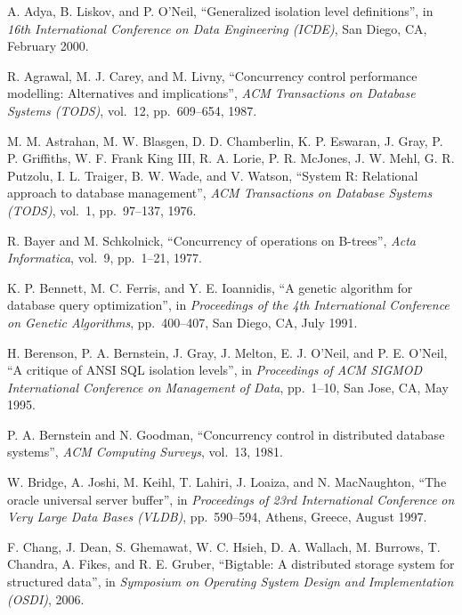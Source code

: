 \documentclass[b5paper,11pt,twoside,openright]{book}
\begin{document}
\begin{enumerate}[label={[\arabic*]}]

\item
  A. Adya, B. Liskov, and P. O'Neil, ``Generalized isolation level
  definitions'', in \emph{16th International Conference on Data Engineering (ICDE)}, San
Diego, CA, February 2000.
\item
  R. Agrawal, M. J. Carey, and M. Livny, ``Concurrency control
  performance modelling: Alternatives and implications'', \emph{ACM
  Transactions on Database Systems (TODS)}, vol.~12, pp.~609--654,
  1987.
\item
  M. M. Astrahan, M. W. Blasgen, D. D. Chamberlin, K. P. Eswaran, J.
  Gray, P. P. Griffiths, W. F. Frank King III, R. A. Lorie, P. R.
  McJones, J. W. Mehl, G. R. Putzolu, I. L. Traiger, B. W. Wade, and V.
  Watson, ``System R: Relational approach to database management'',
  \emph{ACM Transactions on Database Systems} \emph{(TODS)}, vol.~1,
  pp.~97--137, 1976.
\item
  R. Bayer and M. Schkolnick, ``Concurrency of operations on B-trees'',
  \emph{Acta} \emph{Informatica}, vol.~9, pp.~1--21, 1977.
\item
  K. P. Bennett, M. C. Ferris, and Y. E. Ioannidis, ``A genetic
  algorithm for database query optimization'', in \emph{Proceedings of
  the 4th International Conference on Genetic Algorithms},
  pp.~400--407, San Diego, CA, July 1991.
\item
  H. Berenson, P. A. Bernstein, J. Gray, J. Melton, E. J. O'Neil, and P.
  E. O'Neil, ``A critique of ANSI SQL isolation levels'', in
  \emph{Proceedings of ACM SIGMOD} \emph{International Conference on
  Management of Data}, pp.~1--10, San Jose, CA, May 1995.
\item
  P. A. Bernstein and N. Goodman, ``Concurrency control in distributed
  database systems'', \emph{ACM Computing Surveys}, vol.~13, 1981.
\item
  W. Bridge, A. Joshi, M. Keihl, T. Lahiri, J. Loaiza, and N.
  MacNaughton, ``The oracle universal server buffer'', in
  \emph{Proceedings of 23rd International Conference} \emph{on Very
  Large Data Bases (VLDB)}, pp.~590--594, Athens, Greece, August 1997.
\item
  F. Chang, J. Dean, S. Ghemawat, W. C. Hsieh, D. A. Wallach, M.
  Burrows, T. Chandra, A. Fikes, and R. E. Gruber, ``Bigtable: A
  distributed storage system for structured data'', in \emph{Symposium
  on Operating System Design and} \emph{Implementation (OSDI)}, 2006.
\item

\end{enumerate}
\end{document}
